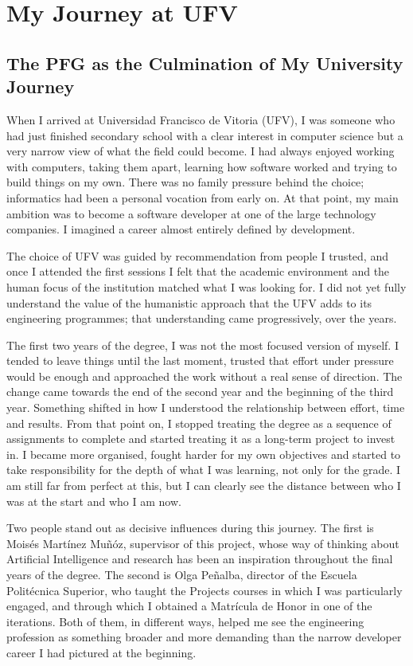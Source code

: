 \chapter{My Journey at UFV}
\setcounter{section}{0}

\section{The PFG as the Culmination of My University Journey}

When I arrived at Universidad Francisco de Vitoria (UFV), I was someone who had just finished
secondary school with a clear interest in computer science but a very narrow view of what the field
could become. I had always enjoyed working with computers, taking them apart, learning how software
worked and trying to build things on my own. There was no family pressure behind the choice;
informatics had been a personal vocation from early on. At that point, my main ambition was to
become a software developer at one of the large technology companies. I imagined a career almost
entirely defined by development.

The choice of UFV was guided by recommendation from people I trusted, and once I attended the first
sessions I felt that the academic environment and the human focus of the institution matched what I
was looking for. I did not yet fully understand the value of the humanistic approach that the UFV
adds to its engineering programmes; that understanding came progressively, over the years.

The first two years of the degree, I was not the most focused version of myself. I tended to leave
things until the last moment, trusted that effort under pressure would be enough and approached the
work without a real sense of direction. The change came towards the end of the second year and the
beginning of the third year. Something shifted in how I understood the relationship between effort,
time and results. From that point on, I stopped treating the degree as a sequence of assignments to
complete and started treating it as a long-term project to invest in. I became more organised,
fought harder for my own objectives and started to take responsibility for the depth of what I was
learning, not only for the grade. I am still far from perfect at this, but I can clearly see the
distance between who I was at the start and who I am now.

Two people stand out as decisive influences during this journey. The first is Mois\'es Mart\'inez
Mu\~n\'oz, supervisor of this project, whose way of thinking about Artificial Intelligence and
research has been an inspiration throughout the final years of the degree. The second is Olga
Pe\~nalba, director of the Escuela Polit\'ecnica Superior, who taught the Projects courses in which
I was particularly engaged, and through which I obtained a Matr\'icula de Honor in one of the
iterations. Both of them, in different ways, helped me see the engineering profession as something
broader and more demanding than the narrow developer career I had pictured at the beginning.

